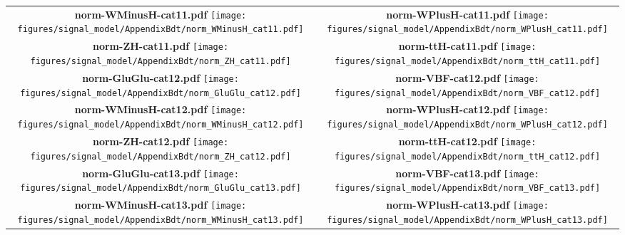 \begin{longtable}{|c|c|}
{}
 \\
\hline
\parbox{0.47\textwidth}{
\centering
{\bfseries norm-WMinusH-cat11.pdf}
\texttt{[image: figures/signal\_model/AppendixBdt/norm\_WMinusH\_cat11.pdf]}
}
 & \parbox{0.47\textwidth}{
\centering
{\bfseries norm-WPlusH-cat11.pdf}
\texttt{[image: figures/signal\_model/AppendixBdt/norm\_WPlusH\_cat11.pdf]}
}
 \\
\hline
\parbox{0.47\textwidth}{
\centering
{\bfseries norm-ZH-cat11.pdf}
\texttt{[image: figures/signal\_model/AppendixBdt/norm\_ZH\_cat11.pdf]}
}
 & \parbox{0.47\textwidth}{
\centering
{\bfseries norm-ttH-cat11.pdf}
\texttt{[image: figures/signal\_model/AppendixBdt/norm\_ttH\_cat11.pdf]}
}
 \\
\hline
\parbox{0.47\textwidth}{
\centering
{\bfseries norm-GluGlu-cat12.pdf}
\texttt{[image: figures/signal\_model/AppendixBdt/norm\_GluGlu\_cat12.pdf]}
}
 & \parbox{0.47\textwidth}{
\centering
{\bfseries norm-VBF-cat12.pdf}
\texttt{[image: figures/signal\_model/AppendixBdt/norm\_VBF\_cat12.pdf]}
}
 \\
\hline
\parbox{0.47\textwidth}{
\centering
{\bfseries norm-WMinusH-cat12.pdf}
\texttt{[image: figures/signal\_model/AppendixBdt/norm\_WMinusH\_cat12.pdf]}
}
 & \parbox{0.47\textwidth}{
\centering
{\bfseries norm-WPlusH-cat12.pdf}
\texttt{[image: figures/signal\_model/AppendixBdt/norm\_WPlusH\_cat12.pdf]}
}
 \\
\hline
\parbox{0.47\textwidth}{
\centering
{\bfseries norm-ZH-cat12.pdf}
\texttt{[image: figures/signal\_model/AppendixBdt/norm\_ZH\_cat12.pdf]}
}
 & \parbox{0.47\textwidth}{
\centering
{\bfseries norm-ttH-cat12.pdf}
\texttt{[image: figures/signal\_model/AppendixBdt/norm\_ttH\_cat12.pdf]}
}
 \\
\hline
\parbox{0.47\textwidth}{
\centering
{\bfseries norm-GluGlu-cat13.pdf}
\texttt{[image: figures/signal\_model/AppendixBdt/norm\_GluGlu\_cat13.pdf]}
}
 & \parbox{0.47\textwidth}{
\centering
{\bfseries norm-VBF-cat13.pdf}
\texttt{[image: figures/signal\_model/AppendixBdt/norm\_VBF\_cat13.pdf]}
}
 \\
\hline
\parbox{0.47\textwidth}{
\centering
{\bfseries norm-WMinusH-cat13.pdf}
\texttt{[image: figures/signal\_model/AppendixBdt/norm\_WMinusH\_cat13.pdf]}
}
 & \parbox{0.47\textwidth}{
\centering
{\bfseries norm-WPlusH-cat13.pdf}
\texttt{[image: figures/signal\_model/AppendixBdt/norm\_WPlusH\_cat13.pdf]}
}
\end{longtable}
